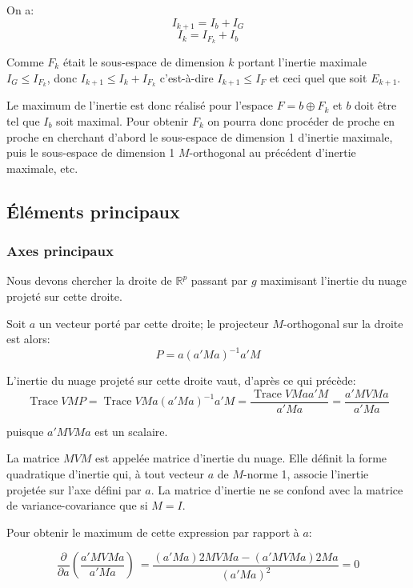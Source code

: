\documentclass[12pt,a4paper]{article}
\begin{document}
On a:
\[I_{k+1} = I_b + I_G\]
\[I_k = I_{F_k} + I_b\]

Comme $F_k$ était le sous-espace de dimension $k$ portant l'inertie maximale $I_G \leq I_{F_k}$, donc
$I_{k+1} \leq I_k + I_{F_k}$ c'est-à-dire $I_{k+1} \leq I_F$ et ceci quel que soit $E_{k+1}$.

Le maximum de l'inertie est donc réalisé pour l'espace $F = b \oplus F_k$ et $b$ doit être tel que $I_b$ soit maximal.
\newline
\vspace{0.8\baselineskip}
\newline
Pour obtenir $F_k$ on pourra donc procéder de proche en proche en cherchant d'abord le sous-espace de dimension 1 d'inertie maximale, puis le sous-espace de dimension 1 $M$-orthogonal au précédent d'inertie maximale, etc.

\subsection{Éléments principaux}

\subsubsection{Axes principaux}

Nous devons chercher la droite de $\mathbb{R}^p$ passant par $g$ maximisant l'inertie du nuage projeté
sur cette droite.

Soit $a$ un vecteur porté par cette droite; le projecteur $M$-orthogonal sur la droite est
alors:
\[P = a(a'Ma)^{-1}a'M\]

L'inertie du nuage projeté sur cette droite vaut, d'après ce qui précède:
\[\operatorname{Trace} V M P = \operatorname{Trace} V M a(a'Ma)^{-1}a'M = \frac{\operatorname{Trace} V M a a'M}{a'M a} = \frac{a'M V M a}{a'M a}\]

puisque $a'M V M a$ est un scalaire.

La matrice $M V M$ est appelée matrice d'inertie du nuage. Elle définit la forme
quadratique d'inertie qui, à tout vecteur $a$ de $M$-norme 1, associe l'inertie projetée sur l'axe
défini par $a$. La matrice d'inertie ne se confond avec la matrice de variance-covariance que
si $M = I$.

Pour obtenir le maximum de cette expression par rapport à $a$:

\[\frac{\partial}{\partial a} \left( \frac{a'M V M a}{a'M a} \right)\ = \frac{(a'Ma) 2 M V M a - (a'M V M a) 2 M a}{(a'M a)^2} = 0\]
\end{document}

